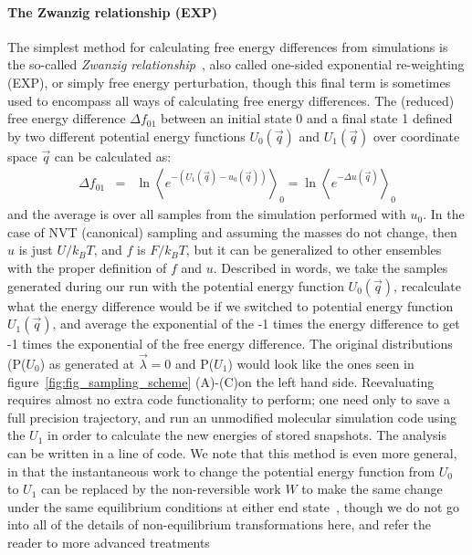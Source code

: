 \documentclass[9pt,bestpractices]{livecoms}
\newcommand{\expect}[1]{\left\langle{#1}\right\rangle}
\begin{document}
\paragraph{The Zwanzig relationship (EXP)}
%
The simplest method for calculating free energy differences from simulations is the so-called \textit{Zwanzig
relationship}~\cite{zwanzig1954hightemperature}, also called one-sided exponential re-weighting (EXP), or simply free energy perturbation, though this final term is sometimes used to encompass all ways of calculating free energy differences.
%
The (reduced) free energy difference $\Delta f_{01}$ between an initial state 0 and a final state 1 defined by two different potential energy functions 
$U_0(\vec{q})$ and $U_1(\vec{q})$ over coordinate space $\vec{q}$ can be calculated as:
\begin{eqnarray}
\Delta f_{01} & = & \ln \expect{e^{-(U_1(\vec{q}) - u_0(\vec{q}))}}_0 =  \ln \expect{e^{-\Delta u(\vec{q})} }_0
\end{eqnarray}\label{eqn.zwanzig}
and the average is over all samples from the simulation performed with $u_0$. In the case of NVT (canonical) sampling and assuming the masses do not change, then $u$ is just $U/k_BT$, and $f$ is $F/k_BT$, but it can be generalized to other ensembles with the proper definition of $f$ and $u$.
Described in words, we take the samples generated during our run with the potential energy function $U_0(\vec{q})$, recalculate what the energy difference would be if we switched to potential energy function $U_1(\vec{q})$, and average the exponential of the -1 times the energy difference to get -1 times the exponential of the free energy difference. The original distributions (P($U_0$) as generated at $\vec{\lambda}=0$ and P($U_1$) would look like the ones seen in figure~\ref{fig:fig_sampling_scheme} (A)-(C)on the left hand side. Reevaluating  requires almost no extra code functionality to perform; one need only to save a full precision trajectory, and run an unmodified molecular simulation code using the $U_1$ in order to calculate the new energies of stored snapshots. The analysis can be written in a line of code.  We note that this method is even more general, in that the instantaneous work to change the potential energy function from $U_0$ to $U_1$ can be replaced by the non-reversible work $W$ to make the same change under the same equilibrium conditions at either end state~\cite{jarzynski1997nonequilibrium,jarzynski1998equilibrium,crooks2000pathensemble}, though we do not go into all of the details of non-equilibrium transformations here, and refer the reader to more advanced treatments~\cite{maragakis2008bayesian,oberhofer2005biased,procacci2015unbiased,shirts2003equilibriuma,ytreberg2004singleensemble}
\end{document}

